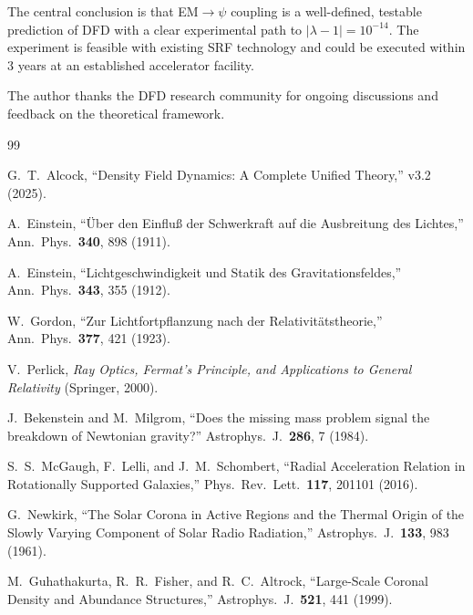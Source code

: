 \documentclass[aps,prd,twocolumn,superscriptaddress,floatfix,nofootinbib]{revtex4-2}
\newcommand{\lam}{\lambda}
\begin{document}
The central conclusion is that EM$\to\psi$ coupling is a well-defined,
testable prediction of DFD with a clear experimental path to
$|\lam-1| = 10^{-14}$. The experiment is feasible with existing SRF
technology and could be executed within 3 years at an established
accelerator facility.

\begin{acknowledgments}
The author thanks the DFD research community for ongoing discussions
and feedback on the theoretical framework.
\end{acknowledgments}

\begin{thebibliography}{99}

G.~T.~Alcock, ``Density Field Dynamics: A Complete Unified Theory,''
v3.2 (2025).

A.~Einstein, ``\"Uber den Einflu{\ss} der Schwerkraft auf die
Ausbreitung des Lichtes,'' Ann.\ Phys.\ \textbf{340}, 898 (1911).

A.~Einstein, ``Lichtgeschwindigkeit und Statik des Gravitationsfeldes,''
Ann.\ Phys.\ \textbf{343}, 355 (1912).

W.~Gordon, ``Zur Lichtfortpflanzung nach der Relativit\"atstheorie,''
Ann.\ Phys.\ \textbf{377}, 421 (1923).

V.~Perlick, \textit{Ray Optics, Fermat's Principle, and Applications
to General Relativity} (Springer, 2000).

J.~Bekenstein and M.~Milgrom, ``Does the missing mass problem signal
the breakdown of Newtonian gravity?'' Astrophys.\ J.\ \textbf{286},
7 (1984).

S.~S.~McGaugh, F.~Lelli, and J.~M.~Schombert, ``Radial Acceleration
Relation in Rotationally Supported Galaxies,'' Phys.\ Rev.\ Lett.\
\textbf{117}, 201101 (2016).

G.~Newkirk, ``The Solar Corona in Active Regions and the Thermal
Origin of the Slowly Varying Component of Solar Radio Radiation,''
Astrophys.\ J.\ \textbf{133}, 983 (1961).

M.~Guhathakurta, R.~R.~Fisher, and R.~C.~Altrock, ``Large-Scale
Coronal Density and Abundance Structures,'' Astrophys.\ J.\
\textbf{521}, 441 (1999).


\end{thebibliography}
\end{document}
